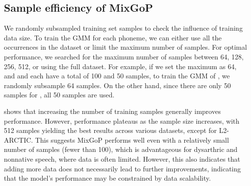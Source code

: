 \subsection{Sample efficiency of MixGoP}\label{subsec:ablation}
We randomly subsampled training set samples to check the influence of training data size.
To train the GMM for each phoneme, we can either use all the occurrences in the dataset or limit the maximum number of samples.
For optimal performance, we searched for the maximum number of samples between 64, 128, 256, 512, or using the full dataset.
For example, if we set the maximum as 64, and  and  each have a total of 100 and 50 samples, to train the GMM of , we randomly subsample 64 samples.
On the other hand, since there are only 50 samples for , all 50 samples are used.



 shows that increasing the number of training samples generally improves performance. 
However, performance plateaus as the sample size increases, with 512 samples yielding the best results across various datasets, except for L2-ARCTIC. 
This suggests MixGoP performs well even with a relatively small number of samples (fewer than 100), which is advantageous for dysarthric and nonnative speech, where data is often limited.
However, this also indicates that adding more data does not necessarily lead to further improvements, indicating that the model's performance may be constrained by data scalability.

